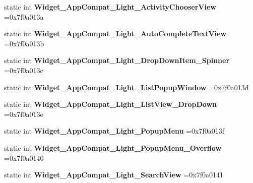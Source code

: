 \begin{DoxyCompactItemize}
static int {\bfseries Widget\+\_\+\+App\+Compat\+\_\+\+Light\+\_\+\+Activity\+Chooser\+View} =0x7f0a013a
\item 
\mbox{\label{classandroid_1_1support_1_1v4_1_1R_1_1style_a013a0766ffd5bf5ffa35ec4fae9b015b}} 
static int {\bfseries Widget\+\_\+\+App\+Compat\+\_\+\+Light\+\_\+\+Auto\+Complete\+Text\+View} =0x7f0a013b
\item 
\mbox{\label{classandroid_1_1support_1_1v4_1_1R_1_1style_a9b2c215552f2ecf0d5407ae3e070bb8b}} 
static int {\bfseries Widget\+\_\+\+App\+Compat\+\_\+\+Light\+\_\+\+Drop\+Down\+Item\+\_\+\+Spinner} =0x7f0a013c
\item 
\mbox{\label{classandroid_1_1support_1_1v4_1_1R_1_1style_abc85d75f5053f4588e4695a41a0dc397}} 
static int {\bfseries Widget\+\_\+\+App\+Compat\+\_\+\+Light\+\_\+\+List\+Popup\+Window} =0x7f0a013d
\item 
\mbox{\label{classandroid_1_1support_1_1v4_1_1R_1_1style_a83e9cd0590dd20b2556a44a3c8e2cbcb}} 
static int {\bfseries Widget\+\_\+\+App\+Compat\+\_\+\+Light\+\_\+\+List\+View\+\_\+\+Drop\+Down} =0x7f0a013e
\item 
\mbox{\label{classandroid_1_1support_1_1v4_1_1R_1_1style_ab19d33a46bf3b873020029b714689b19}} 
static int {\bfseries Widget\+\_\+\+App\+Compat\+\_\+\+Light\+\_\+\+Popup\+Menu} =0x7f0a013f
\item 
\mbox{\label{classandroid_1_1support_1_1v4_1_1R_1_1style_a52e10febf587f0798be3f1712e50bbe8}} 
static int {\bfseries Widget\+\_\+\+App\+Compat\+\_\+\+Light\+\_\+\+Popup\+Menu\+\_\+\+Overflow} =0x7f0a0140
\item 
\mbox{\label{classandroid_1_1support_1_1v4_1_1R_1_1style_a898de0d2604faa6e6052158f623e5fca}} 
static int {\bfseries Widget\+\_\+\+App\+Compat\+\_\+\+Light\+\_\+\+Search\+View} =0x7f0a0141
\item 
\mbox{\label{classandroid_1_1support_1_1v4_1_1R_1_1style_aa176b59d1af1b97881c60246bda761fd}} 

\end{DoxyCompactItemize}
